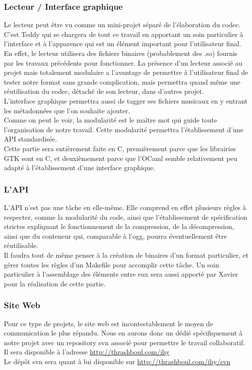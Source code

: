 \documentclass[a4paper,12pt]{article}
\begin{document}
		\subsubsection{Lecteur / Interface graphique}
Le lecteur peut être vu comme  un mini-projet séparé de l'élaboration du
codec.  C'est Teddy qui  se chargera de tout ce  travail en apportant un
soin particulier à  l'interface  et  à  l'apparence  qui  est un élément
important pour l'utilisateur final.  En effet,  le lecteur utilisera des
fichiers  binaires  (probablement  des  .so)  fournis  par  les  travaux
précédents pour fonctionner.  La présence d'un lecteur associé au projet
mais totalement  modulaire  a  l'avantage  de  permettre à l'utilisateur
final de  tester notre format sans  grande complication,  mais permettra
quand même  une réutilisation du  codec,  détaché de  son lecteur,  dans
d'autres projet.\\
L'interface graphique permettra aussi de tagger ses fichiers musicaux en
y entrant les métadonnées que l'on  souhaite ajouter.\\ Comme on peut le
voir,  la modularité est le maître mot qui guide toute l'organisation de
notre  travail.  Cette modularité  permettra  l'établissement  d'une API
standardisée.\\
Cette partie  sera entièrement faite  en C,  premièrement parce  que les
librairies GTK sont  en  C,  et  deuxièmement  parce  que l'OCaml semble
relativement peu adapté à l'établissement d'une interface graphique.

		\subsubsection{L'API}
L'API  n'est  pas  une  tâche  en  elle-même.  Elle  comprend  en  effet
plusieurs règles  à respecter,  comme la modularité  du code,  ainsi que
l'établissement de  spécification strictes expliquant  le fonctionnement
de la  compression,  de la décompression,  ainsi  que du  conteneur qui,
comparable à l'ogg, pourra éventuellement être réutilisable.\\
Il faudra  tout de  même penser à  la création  de binaires  d'un format
particulier,  et gérer  toutes les règles  d'un Makefile  pour accomplir
cette tâche.  Un soin particulier à  l'assemblage des éléments entre eux
sera aussi apporté par Xavier pour la réalisation de cette partie.

		\subsubsection{Site Web}
Pour ce type de projets,  le site  web est incontestablement le moyen de
communication  le   plus  répandu.   Nous  en   aurons  donc   un  dédié
spécifiquement  à  notre projet  avec  un  repository  svn  associé pour
permettre le travail collaboratif.\\
Il sera disponible à l'adresse \url{http://thrashboul.com/ihy}\\
Le    d\'ep\^ot    svn   sera    quant    \`a    lui    disponible   sur
\url{http://thrashboul.com/ihy/svn}
\end{document}
